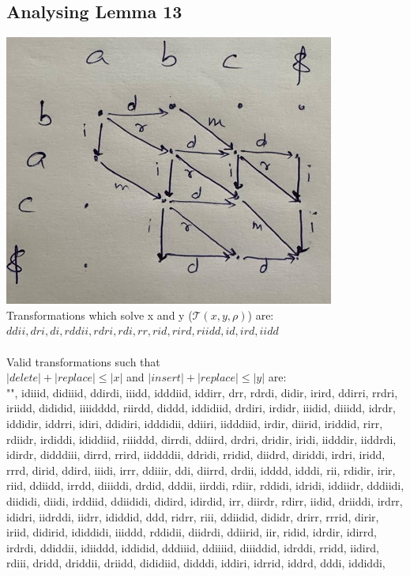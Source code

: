 \documentclass{article}
\begin{document}
\subsection*{Analysing Lemma 13}
\includegraphics{./utils/transformation_example.png}\\
Transformations which solve x and y ($\mathcal{T}(x,y,\rho)$) are:\\
$ddii,dri,di,rddii,rdri,rdi,rr,rid,rird,riidd,id,ird,iidd$\\
\\
Valid transformations such that\\ $|delete|+|replace|\leq |x|$ and $|insert|+
|replace|\leq |y|$ are:\\
"", idiiid, didiiid, ddirdi, iiidd, idddiid, iddirr, drr, rdrdi, didir, irird, 
ddirri, rrdri, iriidd, dididid, iiiidddd, riirdd, diddd, iddidiid, drdiri, 
irdidr, iiidid, diiidd, idrdr, iddidir, iddrri, idiri, ddidiri, idddidii, 
ddiiri, iidddiid, irdir, diirid, iriddid, rirr, rdiidr, irdiddi, ididdiid, 
riiiddd, dirrdi, ddiird, drdri, dridir, iridi, iidddir, iiddrdi, idirdr, 
didddiii, dirrd, rrird, iiddddii, ddridi, rridid, diidrd, diriddi, irdri, iridd,
rrrd, dirid, ddird, iiidi, irrr, ddiiir, ddi, diirrd, drdii, idddd, idddi, rii,
rdidir, irir, riid, ddiidd, irrdd, diiiddi, drdid, dddii, iirddi, rdiir, rddidi, 
idridi, iddiidr, dddiidi, diididi, diidi, irddiid, ddiididi, didird, idirdid, 
irr, diirdr, rdirr, iidid, driiddi, irdrr, ididri, iidrddi, iidrr, ididdid, ddd, 
ridrr, riii, ddiidid, dididr, drirr, rrrid, dirir, iriid, didirid, ididdidi, 
iiiddd, rddidii, diidrdi, ddiirid, iir, ridid, idrdir, idirrd, irdrdi, ddiddii, 
idiiddd, iddidid, dddiiid, ddiiiid, diiiddid, idrddi, rridd, iidird, rdiii, 
dridd, driddii, driidd, dididiid, didddi, iddiri, idrrid, iddrd, dddi, iddiddi, 
\end{document}
